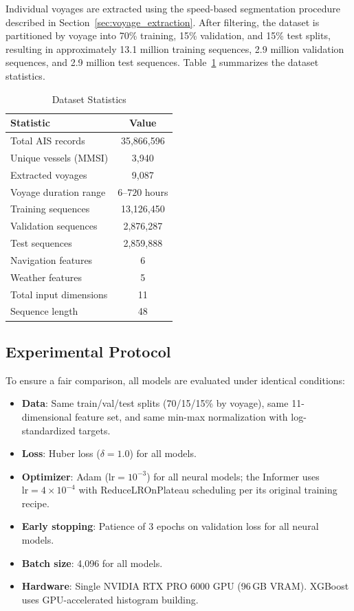 \documentclass[conference]{IEEEtran}
\begin{document}
Individual voyages are extracted using the speed-based segmentation procedure described in Section~\ref{sec:voyage_extraction}.
After filtering, the dataset is partitioned by voyage into 70\% training, 15\% validation, and 15\% test splits, resulting in approximately 13.1 million training sequences, 2.9 million validation sequences, and 2.9 million test sequences.
Table~\ref{tab:dataset} summarizes the dataset statistics.

\begin{table}[t]
    \centering
    \caption{Dataset Statistics}
    \label{tab:dataset}
    \begin{tabular}{lc}
        \toprule
        \textbf{Statistic} & \textbf{Value} \\
        \midrule
        Total AIS records & 35,866,596 \\
        Unique vessels (MMSI) & 3,940 \\
        Extracted voyages & 9,087 \\
        Voyage duration range & $6$--$720$ hours \\
        \midrule
        Training sequences & 13,126,450 \\
        Validation sequences & 2,876,287 \\
        Test sequences & 2,859,888 \\
        \midrule
        Navigation features & 6 \\
        Weather features & 5 \\
        Total input dimensions & 11 \\
        Sequence length & 48 \\
        \bottomrule
    \end{tabular}
\end{table}


\subsection{Experimental Protocol}

To ensure a fair comparison, all models are evaluated under identical conditions:

\begin{itemize}
    \item \textbf{Data}: Same train/val/test splits (70/15/15\% by voyage), same 11-dimensional feature set, and same min-max normalization with log-standardized targets.
    \item \textbf{Loss}: Huber loss ($\delta = 1.0$) for all models.
    \item \textbf{Optimizer}: Adam ($\text{lr} = 10^{-3}$) for all neural models; the Informer uses $\text{lr} = 4 \times 10^{-4}$ with ReduceLROnPlateau scheduling per its original training recipe.
    \item \textbf{Early stopping}: Patience of 3 epochs on validation loss for all neural models.
    \item \textbf{Batch size}: 4,096 for all models.
    \item \textbf{Hardware}: Single NVIDIA RTX PRO 6000 GPU (96\,GB VRAM). XGBoost uses GPU-accelerated histogram building.
\end{itemize}
\end{document}
